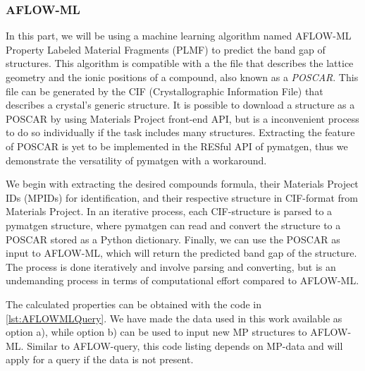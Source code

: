 \subsubsection{AFLOW-ML}

In this part, we will be using a machine learning algorithm named AFLOW-ML Property Labeled Material Fragments (PLMF) \cite{Isayev2017} to predict the band gap of structures. This algorithm is compatible with a the file that describes the lattice geometry and the ionic positions of a compound, also known as a \textit{POSCAR}. This file can be generated by the CIF (Crystallographic Information File) that describes a crystal's generic structure. It is possible to download a structure as a POSCAR by using Materials Project front-end API, but is a inconvenient process to do so individually if the task includes many structures. Extracting the feature of POSCAR is yet to be implemented in the RESful API of pymatgen, thus we demonstrate the versatility of pymatgen with a workaround.

We begin with extracting the desired compounds formula, their Materials Project IDs (MPIDs) for identification, and their respective structure in CIF-format from Materials Project. In an iterative process, each CIF-structure is parsed to a pymatgen structure, where pymatgen can read and convert the structure to a POSCAR stored as a Python dictionary. Finally, we can use the POSCAR as input to AFLOW-ML, which will return the predicted band gap of the structure. The process is done iteratively and involve parsing and converting, but is an undemanding process in terms of computational effort compared to AFLOW-ML.



The calculated properties can be obtained with the code in \autoref{lst:AFLOWMLQuery}. We have made the data used in this work available as option a), while option b) can be used to input new MP structures to AFLOW-ML. Similar to AFLOW-query, this code listing depends on MP-data and will apply for a query if the data is not present.


